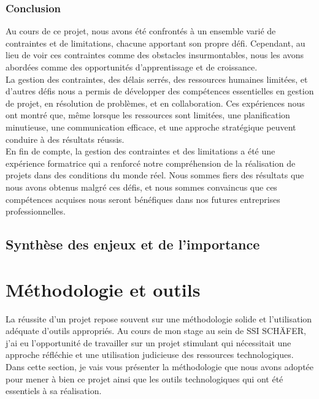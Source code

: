 \documentclass[a4paper, 12pt, french]{article}
\begin{document}
					\subsubsection{Conclusion}
							Au cours de ce projet, nous avons été confrontés à un ensemble varié de contraintes et de limitations, chacune apportant son propre défi. Cependant, au lieu de voir ces contraintes comme des obstacles insurmontables, nous les avons abordées comme des opportunités d'apprentissage et de croissance.\\

							La gestion des contraintes, des délais serrés, des ressources humaines limitées, et d'autres défis nous a permis de développer des compétences essentielles en gestion de projet, en résolution de problèmes, et en collaboration. Ces expériences nous ont montré que, même lorsque les ressources sont limitées, une planification minutieuse, une communication efficace, et une approche stratégique peuvent conduire à des résultats réussis.\\

							En fin de compte, la gestion des contraintes et des limitations a été une expérience formatrice qui a renforcé notre compréhension de la réalisation de projets dans des conditions du monde réel. Nous sommes fiers des résultats que nous avons obtenus malgré ces défis, et nous sommes convaincus que ces compétences acquises nous seront bénéfiques dans nos futures entreprises professionnelles.

			\subsection{Synthèse des enjeux et de l'importance}

		\newpage

		\section{Méthodologie et outils}
			La réussite d'un projet repose souvent sur une méthodologie solide et l'utilisation adéquate d'outils appropriés. Au cours de mon stage au sein de SSI SCHÄFER, j'ai eu l'opportunité de travailler sur un projet stimulant qui nécessitait une approche réfléchie et une utilisation judicieuse des ressources technologiques. Dans cette section, je vais vous présenter la méthodologie que nous avons adoptée pour mener à bien ce projet ainsi que les outils technologiques qui ont été essentiels à sa réalisation.\\
\end{document}
